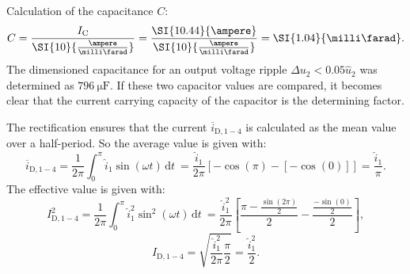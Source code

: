 \begin{solutionblock}
    Calculation of the capacitance $C$:
    \begin{equation}
        C = \frac{I_\mathrm{C}}{\SI{10}{\frac{\ampere}{\milli\farad}}} = \frac{\SI{10.44}{\ampere}}{\SI{10}{\frac{\ampere}{\milli\farad}}}=\SI{1.04}{\milli\farad}.
    \end{equation}
    The dimensioned capacitance for an output voltage ripple $\Delta u_{\mathrm{2}}<0.05  \hat u_{\mathrm{2}}$ was determined as $\SI{796}{\micro\farad}$.
    If these two capacitor values are compared, it becomes clear that the current carrying capacity of the capacitor is the determining factor. 
\end{solutionblock}
\begin{solutionblock}
    The rectification ensures that the current $\overline i_\mathrm{D,1-4}$ is calculated as the mean value over a half-period. So the average value is given with:
    \begin{equation}
        \overline{i}_{\mathrm{D,1-4}} = \frac{1}{2\pi} \int_{0}^{\pi} \hat{i}_{\mathrm{1}} \sin(\omega t) \, \mathrm{d}t\ = \frac{\hat{i}_{\mathrm{1}}}{2\pi} [-\cos(\pi)-[-\cos(0)]] = \frac{\hat{i}_{\mathrm{1}}}{\pi}.
    \end{equation}
    The effective value is given with:
    \begin{equation}
        I^2_{\mathrm{D,1-4}} = \frac{1}{2\pi} \int_{0}^{\pi} \hat{i}^2_{\mathrm{1}} \sin^2(\omega t) \, \mathrm{d}t\ = \frac{\hat{i}^2_{\mathrm{1}}}{2\pi}\left[\frac{\pi-\frac{\sin(2\pi)}{2}}{2}-\frac{\frac{-\sin(0)}{2}}{2}\right], 
    \end{equation}
    \begin{equation}
        I_{\mathrm{D,1-4}} = \sqrt{\frac{\hat{i}^2_{\mathrm{1}}}{2\pi}\frac{\pi}{2}} = \frac{\hat{i}^2_{\mathrm{1}}}{2}.
    \end{equation}
 \end{solutionblock}

